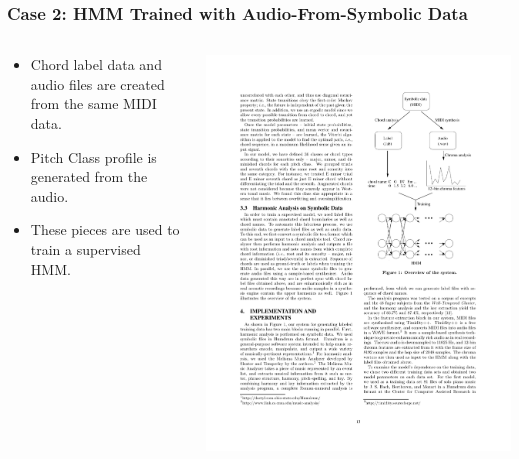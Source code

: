 \documentclass{beamer}
\begin{document}
\begin{frame}
  \frametitle{Case 2: HMM Trained with Audio-From-Symbolic Data}
  \begin{columns}
	\begin{column}{.6\textwidth}
	\begin{itemize}
		\item Chord label data and audio files are created from the same MIDI data.
		\item Pitch Class profile is generated from the audio.
		\item These pieces are used to train a supervised HMM.
	\end{itemize}
	\end{column}
	\begin{column}{.4\textwidth}
  \includegraphics[height=.85\textheight]{fig1.pdf}
  	\end{column}
  	\end{columns}
\end{frame} 
\end{document}

